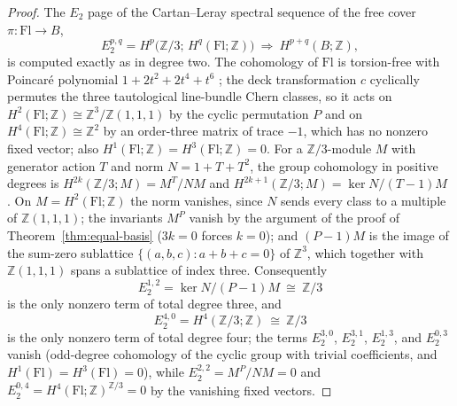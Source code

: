\documentclass[11pt,a4paper]{article}
\begin{document}
\begin{proof}
The $E_2$ page of the Cartan--Leray spectral sequence of the free cover
$\pi\colon\mathrm{Fl}\to B$,
\[
E_2^{p,q}=H^p\bigl(\mathbb Z/3;\,H^q(\mathrm{Fl};\mathbb Z)\bigr)
\ \Longrightarrow\ H^{p+q}(B;\mathbb Z),
\]
is computed exactly as in degree two. The cohomology of $\mathrm{Fl}$ is
torsion-free with Poincar\'e polynomial $1+2t^2+2t^4+t^6$ \cite{Fulton1997};
the deck transformation $c$ cyclically permutes the three tautological
line-bundle Chern classes, so it acts on
$H^2(\mathrm{Fl};\mathbb Z)\cong\mathbb Z^3/\mathbb Z(1,1,1)$ by the cyclic
permutation $P$ and on $H^4(\mathrm{Fl};\mathbb Z)\cong\mathbb Z^2$ by an
order-three matrix of trace $-1$, which has no nonzero fixed vector; also
$H^1(\mathrm{Fl};\mathbb Z)=H^3(\mathrm{Fl};\mathbb Z)=0$. For a
$\mathbb Z/3$-module $M$ with generator action $T$ and norm $N=1+T+T^2$, the
group cohomology in positive degrees is $H^{2k}(\mathbb Z/3;M)=M^{T}/NM$ and
$H^{2k+1}(\mathbb Z/3;M)=\ker N/(T-1)M$ \cite{Brown1982}. On
$M=H^2(\mathrm{Fl};\mathbb Z)$ the norm vanishes, since $N$ sends every class
to a multiple of $\mathbb Z(1,1,1)$; the invariants $M^{P}$ vanish by the
argument of the proof of Theorem~\ref{thm:equal-basis} ($3k=0$ forces $k=0$);
and $(P-1)M$ is the image of the sum-zero sublattice
$\{(a,b,c):a+b+c=0\}$ of $\mathbb Z^3$, which together with $\mathbb Z(1,1,1)$
spans a sublattice of index three. Consequently
\[
E_2^{1,2}=\ker N/(P-1)M\ \cong\ \mathbb Z/3
\]
is the only nonzero term of total degree three, and
\[
E_2^{4,0}=H^4(\mathbb Z/3;\mathbb Z)\ \cong\ \mathbb Z/3
\]
is the only nonzero term of total degree four; the terms $E_2^{3,0}$,
$E_2^{3,1}$, $E_2^{1,3}$, and $E_2^{0,3}$ vanish (odd-degree cohomology of
the cyclic group with trivial coefficients, and
$H^1(\mathrm{Fl})=H^3(\mathrm{Fl})=0$), while $E_2^{2,2}=M^{P}/NM=0$ and
$E_2^{0,4}=H^4(\mathrm{Fl};\mathbb Z)^{\mathbb Z/3}=0$ by the vanishing fixed
vectors.


\end{proof}
\end{document}

